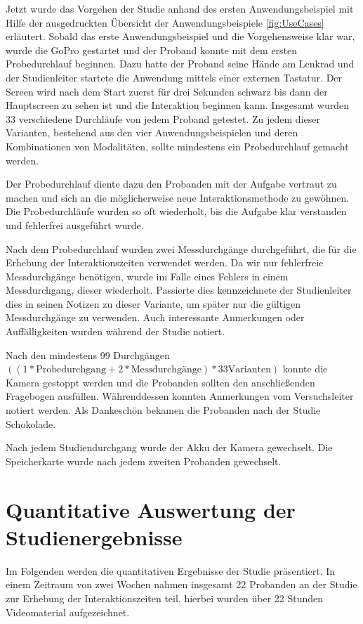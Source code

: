 Jetzt wurde das Vorgehen der Studie anhand des ersten Anwendungsbeispiel mit Hilfe der ausgedruckten Übersicht der Anwendungsbeispiele \ref{fig:UseCases} erläutert.
Sobald das erste Anwendungsbeispiel und die Vorgehensweise klar war, wurde die GoPro gestartet und der Proband konnte mit dem ersten Probedurchlauf beginnen. Dazu hatte der Proband seine Hände am Lenkrad und der Studienleiter startete die Anwendung mittels einer externen Tastatur. 
Der Screen wird nach dem Start zuerst für drei Sekunden schwarz bis dann der Hauptscreen zu sehen ist und die Interaktion beginnen kann.
Insgesamt wurden 33 verschiedene Durchläufe von jedem Proband getestet.
Zu jedem dieser Varianten, bestehend aus den vier Anwendungsbeispielen und deren Kombinationen von Modalitäten, sollte mindestens ein Probedurchlauf gemacht werden.

Der Probedurchlauf diente dazu den Probanden mit der Aufgabe vertraut zu machen und sich an die möglicherweise neue Interaktionsmethode zu gewöhnen.
Die Probedurchläufe wurden so oft wiederholt, bis die Aufgabe klar verstanden und fehlerfrei ausgeführt wurde. 

Nach dem Probedurchlauf wurden zwei Messdurchgänge durchgeführt, die für die Erhebung der Interaktionszeiten verwendet werden.
Da wir nur fehlerfreie Messdurchgänge benötigen, wurde im Falle eines Fehlers in einem Messdurchgang, dieser wiederholt.
Passierte dies kennzeichnete der Studienleiter dies in seinen Notizen zu dieser Variante, um später nur die gültigen Messdurchgänge zu verwenden.
Auch interessante Anmerkungen oder Auffälligkeiten wurden während der Studie notiert.

Nach den mindestens 99 Durchgängen $((1 * \text{Probedurchgang} + 2 * \text{Messdurchgänge}) * 33 \text{Varianten})$ konnte die Kamera gestoppt werden und die Probanden sollten den anschließenden Fragebogen ausfüllen.
Währenddessen konnten Anmerkungen vom Versuchsleiter notiert werden. 
Als Dankeschön bekamen die Probanden nach der Studie Schokolade.

Nach jedem Studiendurchgang wurde der Akku der Kamera gewechselt. Die Speicherkarte wurde nach jedem zweiten Probanden gewechselt.

\section[Quantitative Auswertung]{Quantitative Auswertung der Studienergebnisse}
Im Folgenden werden die quantitativen Ergebnisse der Studie präsentiert.
In einem Zeitraum von zwei Wochen nahmen insgesamt 22 Probanden an der Studie zur Erhebung der Interaktionszeiten teil.
hierbei wurden über 22 Stunden Videomaterial aufgezeichnet. 


